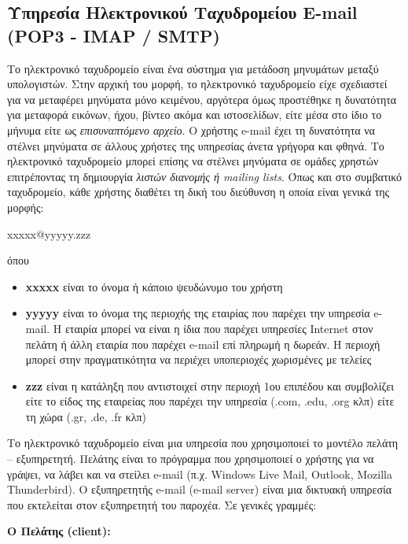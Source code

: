 %
%
\subsection{Υπηρεσία Ηλεκτρονικού Ταχυδρομείου E-mail (POP3 - IMAP / SMTP)}

Το ηλεκτρονικό ταχυδρομείο είναι ένα σύστημα για μετάδοση μηνυμάτων μεταξύ υπολογιστών. Στην αρχική του μορφή, το ηλεκτρονικό ταχυδρομείο είχε σχεδιαστεί για να μεταφέρει μηνύματα μόνο κειμένου, αργότερα όμως προστέθηκε η δυνατότητα για μεταφορά εικόνων, ήχου, βίντεο ακόμα και ιστοσελίδων, είτε μέσα στο ίδιο το μήνυμα είτε ως \emph{επισυναπτόμενο αρχείο}. Ο χρήστης e-mail έχει τη δυνατότητα να στέλνει μηνύματα σε άλλους χρήστες της υπηρεσίας άνετα γρήγορα και φθηνά. Το ηλεκτρονικό ταχυδρομείο μπορεί επίσης να στέλνει μηνύματα σε ομάδες χρηστών επιτρέποντας τη δημιουργία \emph{λιστών διανομής ή mailing lists}. Όπως και στο συμβατικό ταχυδρομείο, κάθε χρήστης διαθέτει τη δική του διεύθυνση η οποία είναι γενικά της μορφής:

\begin{center}
xxxxx@yyyyy.zzz
\end{center}

όπου

\begin{itemize}
\item \textbf{xxxxx} είναι το όνομα ή κάποιο ψευδώνυμο του χρήστη
\item \textbf{yyyyy} είναι το όνομα της περιοχής της εταιρίας που παρέχει την υπηρεσία e-mail. Η εταιρία μπορεί να είναι η ίδια που παρέχει υπηρεσίες Internet στον πελάτη ή άλλη εταιρία που παρέχει e-mail επί πληρωμή η δωρεάν. Η περιοχή μπορεί στην πραγματικότητα να περιέχει υποπεριοχές χωρισμένες με τελείες
\item \textbf{zzz} είναι η κατάληξη που αντιστοιχεί στην περιοχή 1ου επιπέδου και συμβολίζει είτε το είδος της εταιρείας που παρέχει την υπηρεσία (.com, .edu, .org κλπ) είτε τη χώρα (.gr, .de, .fr κλπ)
\end{itemize}

Το ηλεκτρονικό ταχυδρομείο είναι μια υπηρεσία που χρησιμοποιεί το μοντέλο πελάτη -- εξυπηρετητή. Πελάτης είναι το πρόγραμμα που χρησιμοποιεί ο χρήστης για να γράψει, να λάβει και να στείλει e-mail (π.χ. Windows Live Mail, Outlook, Mozilla Thunderbird). Ο εξυπηρετητής e-mail (e-mail server) είναι μια δικτυακή υπηρεσία που εκτελείται στον εξυπηρετητή του παροχέα. Σε γενικές γραμμές:

\textbf{Ο Πελάτης (client):}

